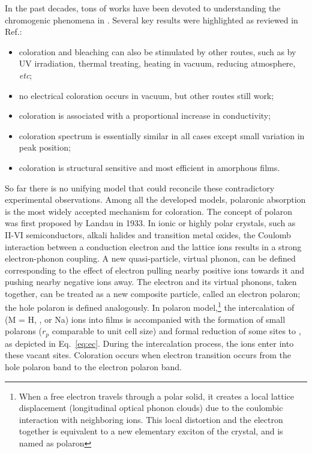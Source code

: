 In the past decades, tons of works have been devoted to understanding the chromogenic phenomena in . Several key results were highlighted as reviewed in Ref.\cite{Deb2008}:
\begin{itemize}
    \item coloration and bleaching can also be stimulated by other routes, such as by UV irradiation, thermal treating, heating in vacuum, reducing atmosphere, \emph{etc};
    \item no electrical coloration occurs in vacuum, but other routes still work;
    \item coloration is associated with a proportional increase in conductivity;
    \item coloration spectrum is essentially similar in all cases except small variation in peak position;
    \item coloration is structural sensitive and most efficient in amorphous films.
\end{itemize}

So far there is no unifying model that could reconcile these contradictory experimental observations. Among all the developed models, polaronic absorption is the most widely accepted mechanism for coloration. The concept of polaron was first proposed by Landau in 1933. In ionic or highly polar crystals, such as II-VI semiconductors, alkali halides and transition metal oxides, the Coulomb interaction between a conduction electron and the lattice ions results in a strong electron-phonon coupling. A new quasi-particle, virtual phonon, can be defined corresponding to the effect of electron pulling nearby positive ions towards it and pushing nearby negative ions away. The electron and its virtual phonons, taken together, can be treated as a new composite particle, called an electron polaron; the hole polaron is defined analogously.\cite{Devreese1996} In polaron model,\footnote{When a free electron travels through a polar solid, it creates a local lattice displacement (longitudinal optical phonon clouds) due to the coulombic interaction with neighboring ions. This local distortion and the electron together is equivalent to a new elementary exciton of the crystal, and is named as polaron} the intercalation of  (M = H, , or Na) ions into  films is accompanied with the formation of small polarons ($r_p$ comparable to unit cell size) and formal reduction of some  sites to , as depicted in Eq.~\ref{eq:ec}. During the intercalation process, the  ions enter into these vacant sites.\cite{Hepel2008} Coloration occurs when electron transition occurs from the hole polaron band to the electron polaron band.

